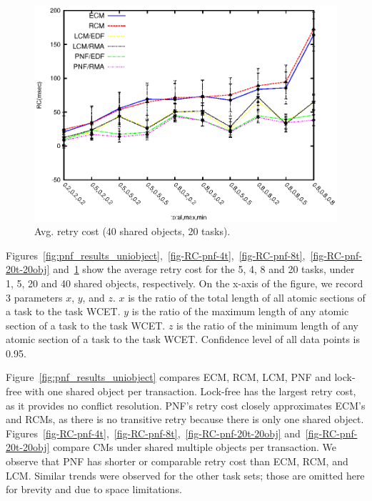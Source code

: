 \documentclass[twocolumn]{article}
\begin{document}
\begin{figure}[h]
\centering
\includegraphics[scale=0.7]{figures/Abr_dur_20t_420obj_100wr}
\caption{Avg. retry cost (40 shared objects, 20 tasks).}
\label{fig-RC-pnf-20t-40obj}
\end{figure}

Figures~\ref{fig:pnf_results_uniobject},~\ref{fig-RC-pnf-4t},~\ref{fig-RC-pnf-8t},~\ref{fig-RC-pnf-20t-20obj} and~\ref{fig-RC-pnf-20t-40obj} show the average retry cost for the 5, 4, 8 and 20 tasks, under 1, 5, 20 and 40 shared objects, respectively. On the x-axis of the figure, we record 3 parameters $x$, $y$, and $z$. $x$ is the ratio of the total length of all atomic sections of a task to the task WCET. $y$ is the ratio of the maximum length of any atomic section of a task to the task WCET. $z$ is the ratio of the minimum length of any atomic section of a task to the task WCET. Confidence level of all data points is 0.95. 

Figure~\ref{fig:pnf_results_uniobject} compares ECM, RCM, LCM, PNF and lock-free with one shared object per transaction. Lock-free has the largest retry cost, as it provides no conflict resolution. PNF's retry cost closely approximates ECM's and RCMs, as there is no transitive retry because there is only one shared object. Figures~\ref{fig-RC-pnf-4t},~\ref{fig-RC-pnf-8t},~\ref{fig-RC-pnf-20t-20obj} and~\ref{fig-RC-pnf-20t-20obj} compare CMs under shared multiple objects per transaction. We observe that PNF has shorter or comparable retry cost than ECM, RCM, and LCM. Similar trends were observed for the other task sets; those are omitted here for brevity and due to space limitations.
\end{document}
